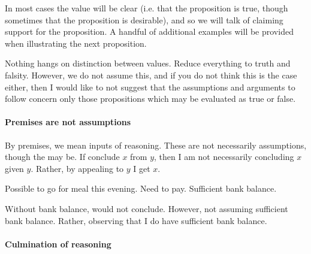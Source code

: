\begin{note}
In most cases the value will be clear (i.e. that the proposition is true, though sometimes that the proposition is desirable), and so we will talk of claiming support for the proposition.
  A handful of additional examples will be provided when illustrating the next proposition.
\end{note}

\begin{note}
  Nothing hangs on distinction between values.
  Reduce everything to truth and falsity.
  However, we do not assume this, and if you do not think this is the case either, then I would like to not suggest that the assumptions and arguments to follow concern only those propositions which may be evaluated as true or false.
\end{note}

\paragraph{Premises are not assumptions}

\begin{note}
  By premises, we mean inputs of reasoning.
  These are not necessarily assumptions, though the may be.
  If conclude \(x\) from \(y\), then I am not necessarily concluding \(x\) given \(y\).
  Rather, by appealing to \(y\) I get \(x\).

  Possible to go for meal this evening.
  Need to pay.
  Sufficient bank balance.

  Without bank balance, would not conclude.
  However, not assuming sufficient bank balance.
  Rather, observing that I do have sufficient bank balance.
\end{note}

\paragraph{Culmination of reasoning}

